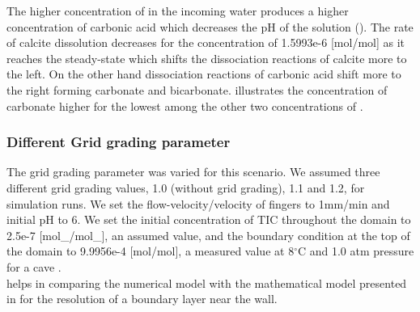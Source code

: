 The higher concentration of  in the incoming water produces a higher concentration of carbonic acid which decreases the pH of 
the solution (). The rate of calcite dissolution decreases for the  concentration
of 1.5993e-6 [mol/mol] as it reaches the steady-state which shifts the dissociation reactions of calcite more to the left. 
On the other hand dissociation reactions of carbonic acid shift more to the right forming carbonate and bicarbonate. 
 illustrates the concentration of carbonate higher for the lowest among the other two concentrations of .


\subsubsection*{Different Grid grading parameter} \label{ssec:diffGrid}

The grid grading parameter was varied for this scenario. We assumed three different grid grading values, 
1.0 (without grid grading), 1.1 and 1.2, for simulation runs. We set the flow-velocity/velocity of  fingers to 1mm/min 
and initial pH to 6. We set the initial concentration of TIC throughout the domain to 2.5e-7 [mol\_/mol\_], 
an assumed value, and the boundary condition at the top of the domain to 9.9956e-4 [mol/mol], a measured value at 8$^{\circ}$C 
and 1.0 atm pressure for a cave \cite{Class2020}. \\

 helps in comparing the numerical model with the mathematical model presented in 
for the resolution of a boundary layer near the wall. \\

